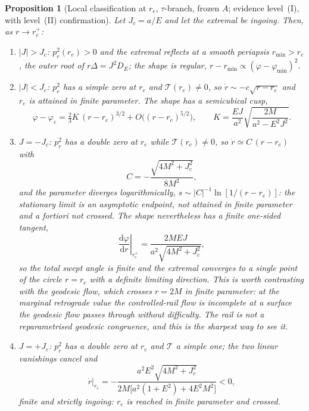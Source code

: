 \documentclass[12pt]{iopart}
\theoremstyle{plain}
\newtheorem{proposition}{Proposition}
\theoremstyle{definition}
\theoremstyle{remark}
\newcommand{\re}{r_{e}}
\newcommand{\Jc}{J_{c}}
\newcommand{\dd}{\mathrm{d}}
\begin{document}
\begin{proposition}[Local classification at $\re$, $\tau$-branch, frozen $A$;
evidence level~(I), with level~(II) confirmation]
\label{prop:classification}
Let $\Jc=a/E$ and let the extremal be ingoing. Then, as $r\to\re^+$:
\begin{enumerate}
\item[\rm(i)] $|J|>\Jc$: $p_r^2(\re)>0$ and the extremal reflects at a smooth
periapsis $r_{\min}>\re$, the outer root of $r\Delta=J^2D_E$; the shape is
regular, $r-r_{\min}\propto(\varphi-\varphi_{\min})^2$.
\item[\rm(ii)] $|J|<\Jc$: $p_r^2$ has a \emph{simple} zero at $\re$ and
$\mathcal T(\re)\neq0$, so $\dot r\sim-c\sqrt{r-\re}$ and $\re$ is attained in
\emph{finite} parameter. The shape has a semicubical cusp,
\begin{equation}
    \varphi-\varphi_e=\tfrac{2}{3}K\,(r-\re)^{3/2}+O\big((r-\re)^{5/2}\big),
    \qquad
    K=\frac{EJ}{a^2}\sqrt{\frac{2M}{a^2-E^2J^2}} .
    \label{eq:cusp}
\end{equation}
\item[\rm(iii)] $J=-\Jc$: $p_r^2$ has a \emph{double} zero at $\re$ while
$\mathcal T(\re)\neq0$, so $\dot r\simeq C\,(r-\re)$ with
\begin{equation}
    C=-\frac{\sqrt{4M^2+\Jc^2}}{8M^2},
    \label{eq:retro-rate}
\end{equation}
and the parameter diverges logarithmically, $s\sim|C|^{-1}\ln[1/(r-\re)]$: the
stationary limit is an \emph{asymptotic endpoint}, not attained in finite
parameter and \emph{a fortiori} not crossed. The shape nevertheless has a finite
one-sided tangent,
\begin{equation}
    \left.\frac{\dd\varphi}{\dd r}\right|_{\re^+}
      =\frac{2MEJ}{a^2\sqrt{4M^2+\Jc^2}},
    \label{eq:corner-slope}
\end{equation}
so the total swept angle is finite and the extremal converges to a single point
of the circle $r=\re$ with a definite limiting direction.
This is worth contrasting with the geodesic flow, which crosses $r=2M$ in finite
parameter: at the marginal retrograde value the \emph{controlled-rail} flow is
incomplete at a surface the geodesic flow passes through without difficulty. The
rail is not a reparametrised geodesic congruence, and this is the sharpest way to
see it.
\item[\rm(iv)] $J=+\Jc$: $p_r^2$ has a double zero at $\re$ \emph{and}
$\mathcal T$ a simple one; the two linear vanishings cancel and
\begin{equation}
    \dot r\big|_{\re}
      =-\frac{a^2E^2\sqrt{4M^2+\Jc^2}}{2M\big[a^2(1+E^2)+4E^2M^2\big]}<0 ,
    \label{eq:pro-rate}
\end{equation}
finite and strictly ingoing: $\re$ is reached in finite parameter and crossed.
\end{enumerate}
\end{proposition}
\end{document}
